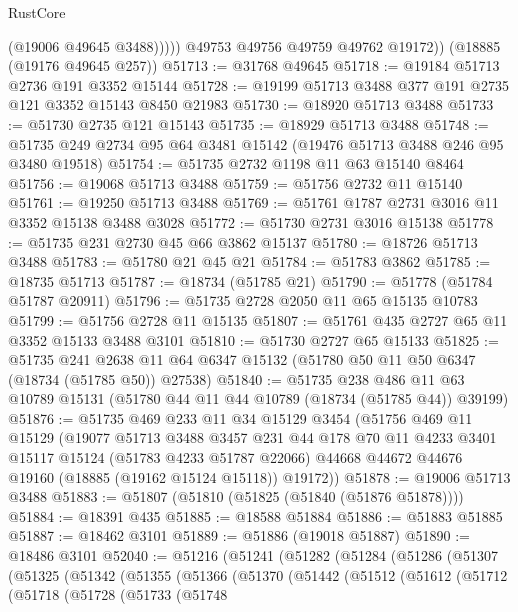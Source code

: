 \begin{lexlean}{RustCore}
\begin{coremodule}
                (@19006 @49645 @3488)))))
        @49753
        @49756
        @49759
        @49762
        @19172))
    (@18885 (@19176 @49645 @257))
@51713 := @31768 @49645
@51718 := @19184 @51713 @2736 @191 @3352 @15144
@51728 := @19199 @51713 @3488 @377 @191 @2735 @121 @3352 @15143 @8450 @21983
@51730 := @18920 @51713 @3488
@51733 := @51730 @2735 @121 @15143
@51735 := @18929 @51713 @3488
@51748 := @51735 @249 @2734 @95 @64 @3481 @15142 (@19476 @51713 @3488 @246 @95 @3480 @19518)
@51754 := @51735 @2732 @1198 @11 @63 @15140 @8464
@51756 := @19068 @51713 @3488
@51759 := @51756 @2732 @11 @15140
@51761 := @19250 @51713 @3488
@51769 := @51761 @1787 @2731 @3016 @11 @3352 @15138 @3488 @3028
@51772 := @51730 @2731 @3016 @15138
@51778 := @51735 @231 @2730 @45 @66 @3862 @15137
@51780 := @18726 @51713 @3488
@51783 := @51780 @21 @45 @21
@51784 := @51783 @3862
@51785 := @18735 @51713
@51787 := @18734 (@51785 @21)
@51790 := @51778 (@51784 @51787 @20911)
@51796 := @51735 @2728 @2050 @11 @65 @15135 @10783
@51799 := @51756 @2728 @11 @15135
@51807 := @51761 @435 @2727 @65 @11 @3352 @15133 @3488 @3101
@51810 := @51730 @2727 @65 @15133
@51825 := @51735
    @241
    @2638
    @11
    @64
    @6347
    @15132
    (@51780 @50 @11 @50 @6347 (@18734 (@51785 @50)) @27538)
@51840 := @51735
    @238
    @486
    @11
    @63
    @10789
    @15131
    (@51780 @44 @11 @44 @10789 (@18734 (@51785 @44)) @39199)
@51876 := @51735
    @469
    @233
    @11
    @34
    @15129
    @3454
    (@51756
      @469
      @11
      @15129
      (@19077
        @51713
        @3488
        @3457
        @231
        @44
        @178
        @70
        @11
        @4233
        @3401
        @15117
        @15124
        (@51783 @4233 @51787 @22066)
        @44668
        @44672
        @44676
        @19160
        (@18885 (@19162 @15124 @15118))
        @19172))
@51878 := @19006 @51713 @3488
@51883 := @51807 (@51810 (@51825 (@51840 (@51876 @51878))))
@51884 := @18391 @435
@51885 := @18588 @51884
@51886 := @51883 @51885
@51887 := @18462 @3101
@51889 := @51886 (@19018 @51887)
@51890 := @18486 @3101
@52040 := @51216
    (@51241
      (@51282
        (@51284
          (@51286
            (@51307
              (@51325
                (@51342
                  (@51355
                    (@51366
                      (@51370
                        (@51442
                          (@51512
                            (@51612
                              (@51712
                                (@51718
                                  (@51728
                                    (@51733
                                      (@51748

\end{coremodule}
\end{lexlean}
